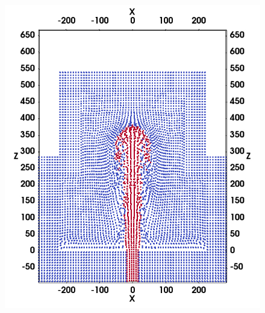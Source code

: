 \begin{figure}
    \centering
    \begin{minipage}[t]{.325 \textwidth}
        \centering
        \includegraphics[width=0.99 \textwidth]{./Chapter-4/Figures/GSPH-HLLC-t1p5-cutView}
    \end{minipage}%
    \begin{minipage}[t]{.325\textwidth}
        \centering

\end{minipage}
\end{figure}
